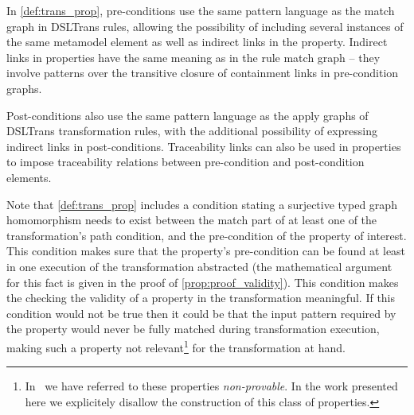 


In \cref{def:trans_prop}, pre-conditions use the same pattern language as the match graph in
DSLTrans rules, allowing the possibility of including several instances of
the same metamodel element as well as indirect links in the property. Indirect links in properties have
the same meaning as in the rule match graph -- they
involve patterns over the transitive closure of containment links in pre-condition graphs.

Post-conditions also use the same pattern language as the
apply graphs of DSLTrans transformation rules, with the additional
possibility of expressing indirect links in post-conditions. Traceability links can
also be used in properties to impose traceability relations between pre-condition
and post-condition elements.

Note that \cref{def:trans_prop} includes a condition stating a surjective typed graph homomorphism needs to exist between the match part of at least one of the transformation's path condition, and the pre-condition of the property of interest. This condition makes sure that the property's pre-condition can be found at least in one execution of the transformation abstracted (the mathematical argument for this fact is given in the proof of \cref{prop:proof_validity}). This condition makes the checking the validity of a property in the transformation meaningful. If this condition would not be true then it could be that the input pattern required by the property would never be fully matched during transformation execution, making such a property not relevant\footnote{In~\cite{DBLP:conf/sle/BarrocaLAFS10} we have referred to these properties \emph{non-provable}. In the work presented here we explicitely disallow the construction of this class of properties.} for the transformation at hand.

